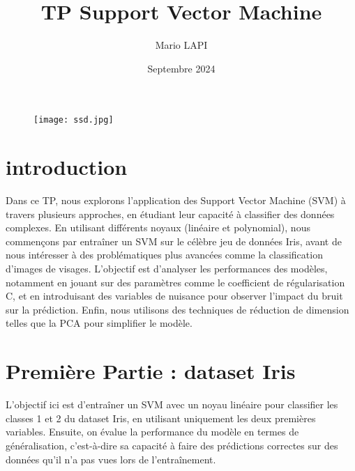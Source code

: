 \documentclass{article}
\begin{document}
\begin{figure}[t]  %
  \texttt{[image: ssd.jpg]}
\end{figure}

\title{TP Support Vector Machine}
\author{Mario LAPI}
\date{Septembre 2024}


\maketitle



\maketitle  %

\vfill  

\newpage
\tableofcontents  %

\section*{introduction}

Dans ce TP, nous explorons l'application des Support Vector Machine  (SVM) à travers plusieurs approches, en étudiant leur capacité à classifier des données complexes. En utilisant différents noyaux (linéaire et polynomial), nous commençons par entraîner un SVM sur le célèbre jeu de données Iris, avant de nous intéresser à des problématiques plus avancées comme la classification d'images de visages. L'objectif est d'analyser les performances des modèles, notamment en jouant sur des paramètres comme le coefficient de régularisation C, et en introduisant des variables de nuisance pour observer l'impact du bruit sur la prédiction. Enfin, nous utilisons des techniques de réduction de dimension telles que la PCA pour simplifier le modèle. 


\newpage
\section{Première Partie : dataset Iris}

L'objectif ici est d'entraîner un SVM avec un noyau linéaire pour classifier les classes 1 et 2 du dataset Iris, en utilisant uniquement les deux premières variables. Ensuite, on évalue la performance du modèle en termes de généralisation, c'est-à-dire sa capacité à faire des prédictions correctes sur des données qu'il n'a pas vues lors de l'entraînement.
\end{document}

